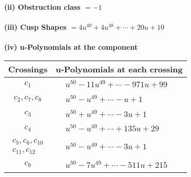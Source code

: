 \documentclass[1p]{elsarticle_modified}
\theoremstyle{definition}
\begin{document}
\flushleft \textbf{(ii) Obstruction class $= -1$}\\~\\
\flushleft \textbf{(iii) Cusp Shapes $= 4 u^{49}+4 u^{48}+\cdots+20 u+10$}\\~\\
\newpage\renewcommand{\arraystretch}{1}
\flushleft \textbf{(iv) u-Polynomials at the component}\newline \\
\begin{tabular}{m{50pt}|m{274pt}}
Crossings & \hspace{64pt}u-Polynomials at each crossing \\
\hline $$\begin{aligned}c_{1}\end{aligned}$$&$\begin{aligned}
&u^{50}-11 u^{49}+\cdots-971 u+99
\end{aligned}$\\
\hline $$\begin{aligned}c_{2},c_{7},c_{8}\end{aligned}$$&$\begin{aligned}
&u^{50}- u^{49}+\cdots- u+1
\end{aligned}$\\
\hline $$\begin{aligned}c_{3}\end{aligned}$$&$\begin{aligned}
&u^{50}+u^{49}+\cdots-3 u+1
\end{aligned}$\\
\hline $$\begin{aligned}c_{4}\end{aligned}$$&$\begin{aligned}
&u^{50}- u^{49}+\cdots+135 u+29
\end{aligned}$\\
\hline $$\begin{aligned}c_{5},c_{6},c_{10}\\c_{11},c_{12}\end{aligned}$$&$\begin{aligned}
&u^{50}- u^{49}+\cdots-3 u+1
\end{aligned}$\\
\hline $$\begin{aligned}c_{9}\end{aligned}$$&$\begin{aligned}
&u^{50}-7 u^{49}+\cdots-511 u+215
\end{aligned}$\\
\hline
\end{tabular}\\~\\
\end{document}
